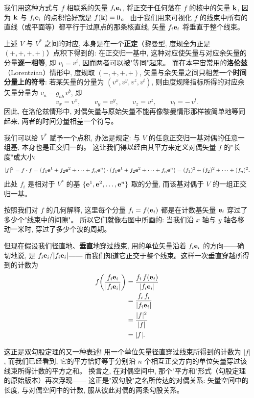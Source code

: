 我们用这种方式与 $f$ 相联系的矢量 $f_{i} \mathbf{e}_{i}$,
将正交于任何落在 $f$ 的核中的矢量 $\mathbf{k}$,
因为 $\mathbf{k}$ 与 $f_{i} \mathbf{e}_{i}$ 的点积恰好就是 $f(\mathbf{k})=0$。
由于我们用来可视化 $f$ 的线束中所有的直线（或平面等）都平行于过原点的那条核直线,
矢量 $f_{i} \mathbf{e}_{i}$ 将垂直于整个线束。

\begin{notebox}[补充: 与洛伦兹情形的对比]
上述 $V$ 与 $V^{*}$ 之间的对应, 本身是在一个\textbf{正定}（黎曼型, 度规全为正是 $(+,+,+,+)$）点积下得到的:
在正交归一基中, 这种对应使矢量与对应余矢量的分量\textbf{逐一相等}, 即 $v_{i} = v^{i}$,
因而两者可以被"等同"起来。
而在本宇宙常用的\textbf{洛伦兹}（Lorentzian）情形中, 度规取 $(-,+,+,+)$,
矢量与余矢量之间只相差一个\textbf{时间分量上的符号}: 若某矢量的分量为 $(v^{x}, v^{y}, v^{z}, v^{t})$,
则由度规降指标所得的对应余矢量分量为 $v_{a} = g_{ab}\, v^{b}$, 即
\[
v_{x} = v^{x}, \qquad v_{y} = v^{y}, \qquad v_{z} = v^{z}, \qquad v_{t} = -\,v^{t}.
\]
因此, 在洛伦兹情形中, 对偶矢量与原始矢量不能再像黎曼情形那样被简单地等同起来,
两者的时间分量相差一个符号。
\end{notebox}

我们可以给 $V^{*}$ 赋予一个点积, 办法是规定:
与 $V$ 的任意正交归一基对偶的任意一组基, 本身也是正交归一的。
这让我们得以经由其平方来定义对偶矢量 $f$ 的"长度"或大小:
\begin{equation}
|f|^{2} = f \cdot f
= (f_{1}\mathbf{e}^{1} + f_{2}\mathbf{e}^{2} + \dots + f_{n}\mathbf{e}^{n})
  \cdot (f_{1}\mathbf{e}^{1} + f_{2}\mathbf{e}^{2} + \dots + f_{n}\mathbf{e}^{n})
= (f_{1})^{2} + (f_{2})^{2} + \dots + (f_{n})^{2}.
\end{equation}
此处 $f_{i}$ 是相对于 $V^{*}$ 的基 $\{\mathbf{e}^{1}, \mathbf{e}^{2}, \dots, \mathbf{e}^{n}\}$ 取的分量,
而该基对偶于 $V$ 的一组正交归一基。


按照我们对 $f$ 的几何解释, 这里每个分量 $f_{i} = f(\mathbf{e}_{i})$ 都是在计数基矢量 $\mathbf{e}_{i}$ 穿过了多少个"线束中的间隙"。
所以它们就像右图中所画的: 当我们沿 $x$ 轴与 $y$ 轴各移动一米时, 穿过了多少个波的周期。

但现在假设我们径直地、\textbf{垂直}地穿过线束,
用的单位矢量沿着 $f_{i} \mathbf{e}_{i}$ 的方向——确切地说, 是 $f_{i} \mathbf{e}_{i} / |f_{i} \mathbf{e}_{i}|$——
而我们知道它正交于整个线束。这样一次垂直穿越所得到的计数为
\begin{align}
f\!\left(\frac{f_{i} \mathbf{e}_{i}}{|f_{i} \mathbf{e}_{i}|}\right)
&= \frac{f_{i}\, f(\mathbf{e}_{i})}{|f_{i} \mathbf{e}_{i}|} \\
&= \frac{f_{i}\, f_{i}}{|f_{i} \mathbf{e}_{i}|} \\
&= \frac{|f|^{2}}{|f|} \\
&= |f|.
\end{align}

这正是双勾股定理的又一种表述!
用一个单位矢量径直穿过线束所得到的计数为 $|f|$,
而我们已经看到, 它的平方恰好等于分别沿 $n$ 个相互正交方向的单位矢量穿过该线束所得计数的平方之和。
换言之, 在对偶空间中, 那个"平方和"形式（勾股定理的原始版本）再次浮现——
这正是"双勾股"之名所传达的对偶关系: 矢量空间中的长度, 与对偶空间中的计数, 服从彼此对偶的两条勾股关系。
